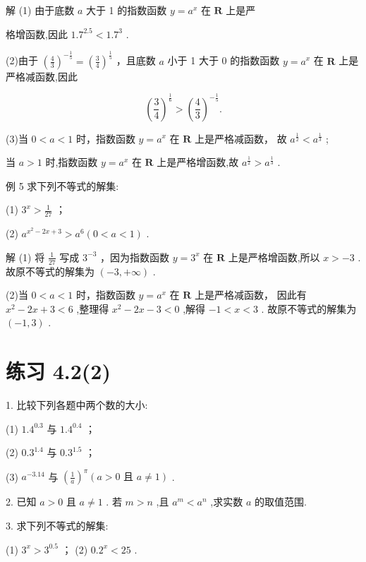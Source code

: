 \documentclass[10pt]{article}
\begin{document}
解 (1) 由于底数 \(a\) 大于 1 的指数函数 \(y = {a}^{x}\) 在 \(\mathbf{R}\) 上是严



格增函数,因此 \({1.7}^{2.5} < {1.7}^{3}\) .

(2)由于 \({\left( \frac{4}{3}\right) }^{-\frac{1}{5}} = {\left( \frac{3}{4}\right) }^{\frac{1}{5}}\) ，且底数 \(a\) 小于 1 大于 0 的指数函数 \(y = {a}^{x}\) 在 \(\mathbf{R}\) 上是严格减函数,因此

\[
{\left( \frac{3}{4}\right) }^{\frac{1}{6}} > {\left( \frac{4}{3}\right) }^{-\frac{1}{5}}.
\]

(3)当 \(0 < a < 1\) 时，指数函数 \(y = {a}^{x}\) 在 \(\mathbf{R}\) 上是严格减函数， 故 \({a}^{\frac{1}{2}} < {a}^{\frac{1}{3}}\) ;

当 \(a > 1\) 时,指数函数 \(y = {a}^{x}\) 在 \(\mathbf{R}\) 上是严格增函数,故 \({a}^{\frac{1}{2}} > {a}^{\frac{1}{3}}\) .

例 5 求下列不等式的解集:

(1) \({3}^{x} > \frac{1}{27}\) ；

(2) \({a}^{{x}^{2} - {2x} + 3} > {a}^{6}\left( {0 < a < 1}\right)\) .

解 (1) 将 \(\frac{1}{27}\) 写成 \({3}^{-3}\) ，因为指数函数 \(y = {3}^{x}\) 在 \(\mathbf{R}\) 上是严格增函数,所以 \(x >  - 3\) . 故原不等式的解集为 \(\left( {-3, + \infty }\right)\) .

(2)当 \(0 < a < 1\) 时，指数函数 \(y = {a}^{x}\) 在 \(\mathbf{R}\) 上是严格减函数， 因此有 \({x}^{2} - {2x} + 3 < 6\) ,整理得 \({x}^{2} - {2x} - 3 < 0\) ,解得 \(- 1 < x < 3\) . 故原不等式的解集为 \(\left( {-1,3}\right)\) .

\section*{练习 4.2(2)}

1. 比较下列各题中两个数的大小:

(1) \({1.4}^{0.3}\) 与 \({1.4}^{0.4}\) ；

(2) \({0.3}^{1.4}\) 与 \({0.3}^{1.5}\) ；

(3) \({a}^{-{3.14}}\) 与 \({\left( \frac{1}{a}\right) }^{\pi }\left( {a > 0\text{ 且 }a \neq  1}\right)\) .

2. 已知 \(a > 0\) 且 \(a \neq  1\) . 若 \(m > n\) ,且 \({a}^{m} < {a}^{n}\) ,求实数 \(a\) 的取值范围.

3. 求下列不等式的解集:

(1) \({3}^{x} > {3}^{0.5}\) ； (2) \({0.2}^{x} < {25}\) .
\end{document}
